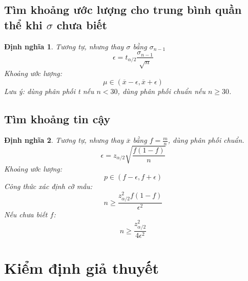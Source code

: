 \documentclass[12pt]{article}
\def\bar#1{\overline{#1}}
\newtheorem{thm}{Định nghĩa}
\begin{document}
\subsection{Tìm khoảng ước lượng cho trung bình quần thể khi $\sigma$ chưa biết}
\begin{thm}
    Tương tự, nhưng thay $\sigma$ bằng $\sigma _{n - 1}$ \\

\begin{equation}
    \epsilon = t_{\alpha/2} \frac{\sigma _{n - 1}}{\sqrt{n}}
\end{equation}
Khoảng ước lượng: \begin{equation}
    \mu \in (\bar{x} - \epsilon, \bar{x} + \epsilon)
\end{equation}
Lưu ý: dùng phân phối t nếu $n < 30$, dùng phân phối chuẩn nếu $n \geq 30$. \\


\end{thm}

\subsection{Tìm khoảng tin cậy}
\begin{thm}
    Tương tự, nhưng thay $\bar{x}$ bằng $f = \frac{m}{n}$, dùng phân phối chuẩn. \\

\begin{equation}
    \epsilon = z_{\alpha/2} \sqrt{\frac{f(1 - f)}{n}}
\end{equation}
Khoảng ước lượng: \begin{equation}
    p \in (f - \epsilon, f + \epsilon)
\end{equation}
Công thức xác định cỡ mẫu:
\begin{equation}
    n \geq \frac{z_{\alpha/2}^2 f(1 - f)}{\epsilon^2}
\end{equation}
Nếu chưa biết $f$:
\begin{equation}
    n \geq \frac{z_{\alpha/2}^2}{4\epsilon^2}
\end{equation}

\end{thm}

\section {Kiểm định giả thuyết}
\end{document}

